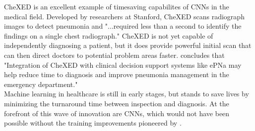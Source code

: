 \documentclass[11pt, a4paper]{article}
\begin{document}
CheXED is an excellent example of timesaving capabilites of CNNs in the medical field. Developed by researchers at Stanford, 
CheXED scans radiograph images to detect pneumonia and "...required less than a second to identify the findings on a single chest 
radiograph." \cite{irvin} CheXED is not yet capable of independently diagnosing a patient, but it does provide powerful initial 
scan that can then direct doctors to potential problem areas faster. \cite{irvin} concludes that "Integration of CheXED with clinical 
decision support systems like ePNa may help reduce time to diagnosis and improve pneumonia management in the emergency department." \\

Machine learning in healthcare is still in early stages, but stands to save lives by minimizing the turnaround time between inspection 
and diagnosis. At the forefront of this wave of innovation are CNNs, which would not have been possible without the training improvements 
pioneered by \cite{lecun}.
\end{document}
